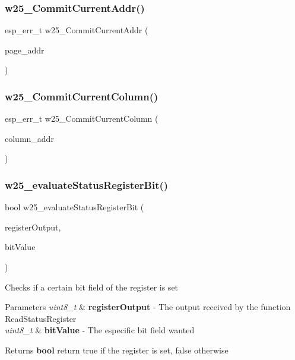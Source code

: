 \subsubsection{w25\+\_\+\+Commit\+Current\+Addr()}
{\footnotesize\ttfamily esp\+\_\+err\+\_\+t w25\+\_\+\+Commit\+Current\+Addr (\begin{DoxyParamCaption}\item[{uint16\+\_\+t}]{page\+\_\+addr }\end{DoxyParamCaption})}

\mbox{\label{_w25_n01_g_v_8h_aa0a8c7a4e64431ab879d3666a090ccb7}} 
\subsubsection{w25\+\_\+\+Commit\+Current\+Column()}
{\footnotesize\ttfamily esp\+\_\+err\+\_\+t w25\+\_\+\+Commit\+Current\+Column (\begin{DoxyParamCaption}\item[{uint16\+\_\+t}]{column\+\_\+addr }\end{DoxyParamCaption})}

\mbox{\label{_w25_n01_g_v_8h_aa0de5ea92ff19da9bd3efdf057c01e6d}} 
\subsubsection{w25\+\_\+evaluate\+Status\+Register\+Bit()}
{\footnotesize\ttfamily bool w25\+\_\+evaluate\+Status\+Register\+Bit (\begin{DoxyParamCaption}\item[{uint8\+\_\+t}]{register\+Output,  }\item[{uint8\+\_\+t}]{bit\+Value }\end{DoxyParamCaption})}

Checks if a certain bit field of the register is set 
\begin{DoxyParams}{Parameters}
{\em uint8\+\_\+t} & {\bfseries register\+Output} -\/ The output received by the function Read\+Status\+Register \\
\hline
{\em uint8\+\_\+t} & {\bfseries bit\+Value} -\/ The especific bit field wanted \\
\hline
\end{DoxyParams}
\begin{DoxyReturn}{Returns}
{\bfseries bool} return true if the register is set, false otherwise 
\end{DoxyReturn}
\mbox{\label{_w25_n01_g_v_8h_a59711eeea7d2ba8d056f644370bfad21}} 
